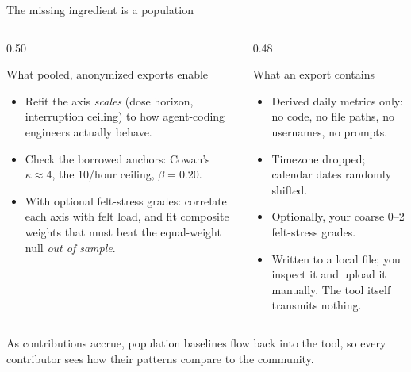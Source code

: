 \documentclass[aspectratio=169,10pt]{beamer}
\newcommand{\good}[1]{\textcolor{Sage}{#1}}
\newcommand{\badc}[1]{\textcolor{Rust}{#1}}
\begin{document}
\begin{frame}{The missing ingredient is a population}
  \begin{columns}[T]
    \begin{column}{0.50\textwidth}
      {\small\good{What pooled, anonymized exports enable}\par}
      \begin{itemize}
        \item Refit the axis \emph{scales} (dose horizon, interruption
              ceiling) to how agent-coding engineers actually behave.
        \item Check the borrowed anchors: Cowan's $\kappa\approx4$, the
              10/hour ceiling, $\beta=0.20$.
        \item With optional felt-stress grades: correlate each axis with
              felt load, and fit composite weights that must beat the
              equal-weight null \emph{out of sample}.
      \end{itemize}
    \end{column}
    \begin{column}{0.48\textwidth}
      {\small\good{What an export contains}\par}
      \begin{itemize}
        \item Derived daily metrics only: \badc{no code, no file paths, no
              usernames, no prompts}.
        \item Timezone dropped; calendar dates \good{randomly shifted}.
        \item Optionally, your coarse 0--2 felt-stress grades.
        \item Written to a \good{local file}; you inspect it and upload it
              \good{manually}. The tool itself transmits nothing.
      \end{itemize}
    \end{column}
  \end{columns}
  \vspace{2mm}
  {\small As contributions accrue, population baselines flow \good{back into
   the tool}, so every contributor sees how their patterns compare to the
   community.\par}
\end{frame}
\end{document}
